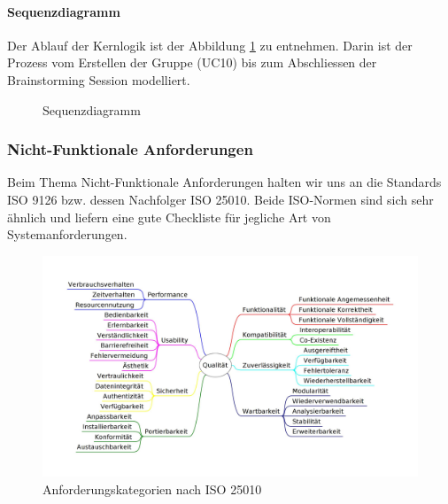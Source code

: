 \paragraph{Sequenzdiagramm}
Der Ablauf der Kernlogik ist der Abbildung \ref{fig:seq-methode635} zu entnehmen. Darin ist der Prozess vom Erstellen der Gruppe (UC10) bis zum Abschliessen der Brainstorming Session modelliert.
\begin{figure}[h]
	\centering
	\caption{Sequenzdiagramm}
	\label{fig:seq-methode635}
\end{figure}


\subsubsection{Nicht-Funktionale Anforderungen}
Beim Thema Nicht-Funktionale Anforderungen halten wir uns an die Standards ISO 9126\cite{ISO9126} bzw. dessen Nachfolger ISO 25010\cite{ISO9126_ISO25010}. Beide ISO-Normen sind sich sehr ähnlich und liefern eine gute Checkliste für jegliche Art von Systemanforderungen.

\begin{figure}[h]
	\centering
	\includegraphics[width=1\linewidth]{img/anforderungen/quality}
	\caption[Anforderungskategorien nach ISO 25010]{Anforderungskategorien nach  ISO 25010}
	\label{fig:ISO 25010}
\end{figure}

